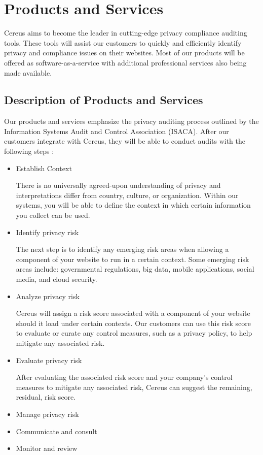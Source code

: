 {\let\cleardoublepage\relax \chapter{Products and Services}}

Cereus aims to become the leader in cutting-edge privacy compliance auditing tools. These tools will assist our customers to quickly and efficiently identify privacy and compliance issues on their websites. Most of our products will be offered as software-as-a-service with additional professional services also being made available. 

\section{Description of Products and Services}

Our products and services emphasize the privacy auditing process outlined by the Information Systems Audit and Control Association (ISACA). After our customers integrate with Cereus, they will be able to conduct audits with the following steps \cite{ISACA.2014}:

\begin{itemize}

\item Establish Context

There is no universally agreed-upon understanding of privacy and interpretations differ from country, culture, or organization. Within our systems, you will be able to define the context in which certain information you collect can be used. 

\item Identify privacy risk

The next step is to identify any emerging risk areas when allowing a component of your website to run in a certain context. Some emerging risk areas include: governmental regulations, big data, mobile applications, social media, and cloud security.

\item Analyze privacy risk

Cereus will assign a risk score associated with a component of your website should it load under certain contexts. Our customers can use this risk score to evaluate or curate any control measures, such as a privacy policy, to help mitigate any associated risk.

\item Evaluate privacy risk

After evaluating the associated risk score and your company's control measures to mitigate any associated risk, Cereus can suggest the remaining, residual, risk score.

\item Manage privacy risk



\item Communicate and consult
\item Monitor and review

\end{itemize}

